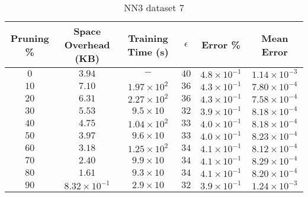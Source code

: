 \begin{adjustwidth}{0cm}{}
\begin{table}
\caption{NN3 dataset 7}\label{pr37}
\begin{tabular}{cccccc}
\hline
\toprule
Pruning \% & Space Overhead (KB) & Training Time (s) & $\epsilon$ & Error \% & Mean Error\\
\midrule
$0$ & $3.94$ & $-$ & $40$ & $4.8 \times 10^{-1}$ & $1.14 \times 10^{-3}$\\
$10$ & $7.10$ & $1.97  \times 10^{2}$ & $36$ & $4.3 \times 10^{-1}$ & $7.80 \times 10^{-4}$\\
$20$ & $6.31$ & $2.27 \times 10^{2}$ & $36$ & $4.3 \times 10^{-1}$ & $7.58 \times 10^{-4}$\\
$30$ & $5.53$ & $9.5 \times 10$ & $32$ & $3.9 \times 10^{-1}$ & $8.18 \times 10^{-4}$\\
$40$ & $4.75$ & $1.04 \times 10^{2}$ & $33$ & $4.0 \times 10^{-1}$ & $8.18 \times 10^{-4}$\\
$50$ & $3.97$ & $9.6 \times 10$ & $33$ & $4.0 \times 10^{-1}$ & $8.23 \times 10^{-4}$\\
$60$ & $3.18$ & $1.25 \times 10^{2}$ & $34$ & $4.1 \times 10^{-1}$ & $8.12 \times 10^{-4}$\\
$70$ & $2.40$ & $9.9 \times 10$ & $34$ & $4.1 \times 10^{-1}$ & $8.29 \times 10^{-4}$\\
$80$ & $1.61$ & $9.3 \times 10$ & $34$ & $4.1 \times 10^{-1}$ & $8.20 \times 10^{-4}$\\
$90$ & $8.32 \times 10^{-1}$ & $2.9 \times 10$ & $32$ & $3.9 \times 10^{-1}$ & $1.24 \times 10^{-3}$\\
\bottomrule
\end{tabular}
\end{table}
\end{adjustwidth}

\null\par\null

